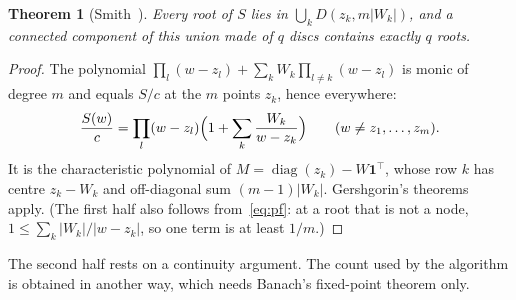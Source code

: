 \documentclass[10pt,a4paper]{article}
\newtheorem{theorem}{Theorem}[section]
\theoremstyle{definition}
\numberwithin{equation}{section}
\begin{document}
\begin{theorem}[Smith~\cite{smith}]\label{thm:smith}
Every root of $S$ lies in $\bigcup_kD(z_k,m|W_k|)$, and a connected component of this union made of
$q$ discs contains exactly $q$ roots.
\end{theorem}
\begin{proof}
The polynomial $\prod_l(w-z_l)+\sum_kW_k\prod_{l\ne k}(w-z_l)$ is monic of degree $m$ and equals $S/c$
at the $m$ points $z_k$, hence everywhere:
\begin{equation}\label{eq:pf}
\frac{S(w)}{c}=\prod_l(w-z_l)\Bigl(1+\sum_k\frac{W_k}{w-z_k}\Bigr)\qquad(w\ne z_1,\dots,z_m).
\end{equation}
It is the characteristic polynomial of $M=\operatorname{diag}(z_k)-W\mathbf 1^{\!\top}$, whose row $k$
has centre $z_k-W_k$ and off-diagonal sum $(m-1)|W_k|$. Gershgorin's theorems~\cite{gersh} apply.
(The first half also follows from~\eqref{eq:pf}: at a root that is not a node,
$1\le\sum_k|W_k|/|w-z_k|$, so one term is at least $1/m$.)
\end{proof}
The second half rests on a continuity argument. The count used by the algorithm is obtained in
another way, which needs Banach's fixed-point theorem only.
\end{document}
